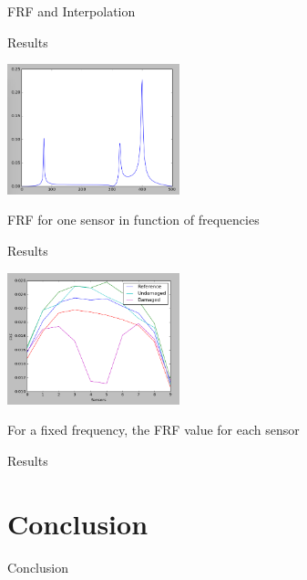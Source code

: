 \documentclass{beamer}
\begin{document}
\begin{frame}{FRF and Interpolation}
\end{frame}

\begin{frame}{Results}
\begin{center}
\includegraphics[width=5cm]{images/FRF_freq.png}

FRF for one sensor in function of frequencies
\end{center}
\end{frame}

\begin{frame}{Results}
\begin{center}
\includegraphics[width=5cm]{images/curve_damage.png}

For a fixed frequency, the FRF value for each sensor
\end{center}

\end{frame}

\begin{frame}{Results}
\end{frame}



\section{Conclusion}

\begin{frame}{Conclusion}
\end{frame}


  
\end{document}
